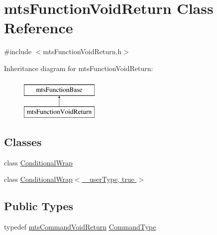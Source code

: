 \hypertarget{classmts_function_void_return}{}\section{mts\+Function\+Void\+Return Class Reference}
\label{classmts_function_void_return}


{\ttfamily \#include $<$mts\+Function\+Void\+Return.\+h$>$}

Inheritance diagram for mts\+Function\+Void\+Return\+:\begin{figure}[H]
\begin{center}
\leavevmode
\includegraphics[height=2.000000cm]{db/dd6/classmts_function_void_return}
\end{center}
\end{figure}
\subsection*{Classes}
\begin{DoxyCompactItemize}
\item 
class \hyperlink{classmts_function_void_return_1_1_conditional_wrap}{Conditional\+Wrap}
\item 
class \hyperlink{classmts_function_void_return_1_1_conditional_wrap_3_01__user_type_00_01true_01_4}{Conditional\+Wrap$<$ \+\_\+user\+Type, true $>$}
\end{DoxyCompactItemize}
\subsection*{Public Types}
\begin{DoxyCompactItemize}
\item 
typedef \hyperlink{classmts_command_void_return}{mts\+Command\+Void\+Return} \hyperlink{classmts_function_void_return_a8aa3dea44f20057e4f47cbb20de87365}{Command\+Type}
\end{DoxyCompactItemize}
